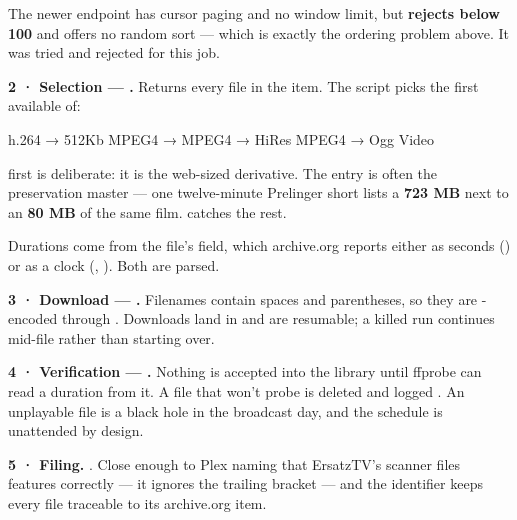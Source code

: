 \documentclass[fontpath=fonts/,logopath=logo/]{riposte-doc}
\begin{document}
\begin{ripnote}
The newer  endpoint has cursor paging and no window limit, but \textbf{rejects  below 100} and offers no random sort — which is exactly the ordering problem above. It was tried and rejected for this job.
\end{ripnote}

\textbf{2 · Selection — .} Returns every file in the item. The script picks the first available of:

\ripcodeopen
{}
\begin{ripcodeblock}
h.264  →  512Kb MPEG4  →  MPEG4  →  HiRes MPEG4  →  Ogg Video
\end{ripcodeblock}
\ripcodesizereset\ripcodeclose

 first is deliberate: it is the web-sized derivative. The  entry is often the preservation master — one twelve-minute Prelinger short lists a \textbf{723 MB}  next to an \textbf{80 MB}  of the same film.  catches the rest.

Durations come from the file's  field, which archive.org reports either as seconds () or as a clock (, ). Both are parsed.

\textbf{3 · Download — .} Filenames contain spaces and parentheses, so they are -encoded through . Downloads land in  and are  resumable; a killed run continues mid-file rather than starting over.

\textbf{4 · Verification — .} Nothing is accepted into the library until ffprobe can read a duration from it. A file that won't probe is deleted and logged . An unplayable file is a black hole in the broadcast day, and the schedule is unattended by design.

\textbf{5 · Filing.} . Close enough to Plex naming that ErsatzTV's scanner files features correctly — it ignores the trailing bracket — and the identifier keeps every file traceable to its archive.org item.
\end{document}
